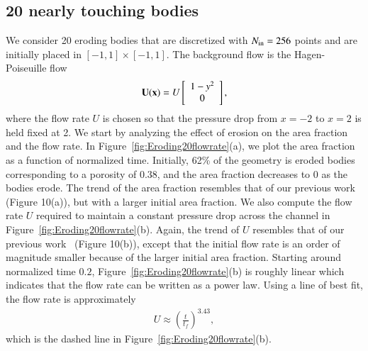 \documentclass[preprint, 10pt]{elsarticle}
\begin{document}
\subsection{20 nearly touching bodies}
We consider 20 eroding bodies that are discretized with $N_{\mathrm{in}}=256$
points and are initially placed in $[-1,1] \times [-1,1]$.  The
background flow is the Hagen-Poiseuille flow
\begin{align}
  {\mathbf{U}}({\mathbf{x}})=U \left[
  \begin{array}{c}
    1-y^2 \\ 0
  \end{array}
  \right],
\end{align}
where the flow rate $U$ is chosen so that the pressure drop from $x=-2$
to $x=2$ is held fixed at 2.  We start by analyzing the effect of
erosion on the area fraction and the flow rate.  In
Figure~\ref{fig:Eroding20flowrate}(a), we plot the area fraction as a
function of normalized time.  Initially, 62\% of the geometry is eroded
bodies corresponding to a porosity of $0.38$, and the area fraction
decreases to 0 as the bodies erode.  The trend of the area fraction
resembles that of our previous work~\cite{qua-moo2018} (Figure 10(a)),
but with a larger initial area fraction.  We also compute the flow rate
$U$ required to maintain a constant pressure drop across the channel in
Figure~\ref{fig:Eroding20flowrate}(b).  Again, the trend of $U$
resembles that of our previous work~\cite{qua-moo2018} (Figure 10(b)),
except that the initial flow rate is an order of magnitude smaller
because of the larger initial area fraction.  Starting around normalized
time $0.2$, Figure~\ref{fig:Eroding20flowrate}(b) is roughly linear
which indicates that the flow rate can be written as a power law.  Using
a line of best fit, the flow rate is approximately 
\begin{align} 
  U \approx \left(\frac{t}{t_f}\right)^{3.43},
\end{align}
which is the dashed line in Figure~\ref{fig:Eroding20flowrate}(b).
\end{document}
